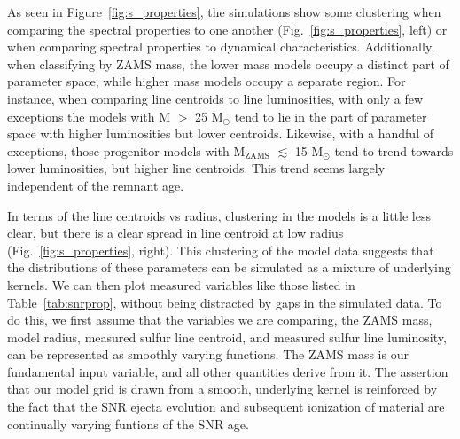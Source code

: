 \documentclass[twocolumn]{aastex631}
\begin{document}
As seen in Figure~\ref{fig:s_properties}, the simulations show some clustering when comparing the spectral properties to one another (Fig.~\ref{fig:s_properties}, left) or when comparing spectral properties to dynamical characteristics. Additionally, when classifying by ZAMS mass, the lower mass models occupy a distinct part of parameter space, while higher mass models occupy a separate region. For instance, when comparing line centroids to line luminosities, with only a few exceptions the models with M $>$ 25 M$_{\odot}$ tend to lie in the part of parameter space with higher luminosities but lower centroids. Likewise, with a handful of exceptions, those progenitor models with M$_{\mathrm{ZAMS}}$ $\lesssim$ 15 M$_{\odot}$ tend to trend towards lower luminosities, but higher line centroids. This trend seems largely independent of the remnant age. 

In terms of the line centroids vs radius, clustering in the models is a little less clear, but there is a clear spread in line centroid at low radius (Fig.~\ref{fig:s_properties}, right). This clustering of the model data suggests that the distributions of these parameters can be simulated as a mixture of underlying kernels. We can then plot measured variables like those listed in Table~\ref{tab:snrprop}, without being distracted by gaps in the simulated data. To do this, we first assume that the variables we are comparing, the ZAMS mass, model radius, measured sulfur line centroid, and measured sulfur line luminosity, can be represented as smoothly varying functions. The ZAMS mass is our fundamental input variable, and all other quantities derive from it. The assertion that our model grid is drawn from a smooth, underlying kernel is reinforced by the fact that the SNR ejecta evolution and subsequent ionization of material are continually varying funtions of the SNR age. 
\end{document}
